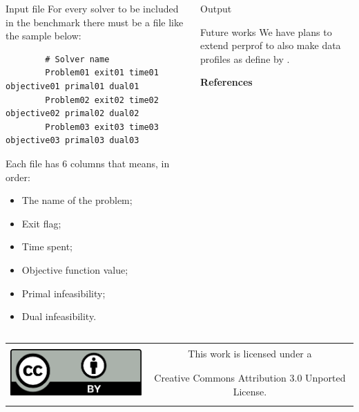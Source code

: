 \documentclass[]{beamer}
\begin{document}
\begin{frame}[t,fragile]
\begin{columns}[t]
\begin{column}{0.4\textwidth}
      \begin{block}{Input file}
        For every solver to be included in the benchmark there must be a file like
        the sample below:

        \begin{lstlisting}
        # Solver name
        Problem01 exit01 time01 objective01 primal01 dual01
        Problem02 exit02 time02 objective02 primal02 dual02
        Problem03 exit03 time03 objective03 primal03 dual03
        \end{lstlisting}

        Each file has 6 columns that means, in order:
        \begin{itemize}
          \item The name of the problem;
          \item Exit flag;
          \item Time spent;
          \item Objective function value;
          \item Primal infeasibility;
          \item Dual infeasibility.
        \end{itemize}
      \end{block}
    \end{column}
    \begin{column}{0.4\textwidth}
      \begin{block}{Output}
        
      \end{block}

      \begin{block}{Future works}
        We have plans to extend perprof to also make data profiles as define by
        \citeauthor{More2009}.
      \end{block}

      \textbf{References}

      \printbibliography
    \end{column}
  \end{columns}
  \vfill
  \begin{center}
    \begin{tabular}[]{cc}
      \multirow{2}{*}{\includegraphics[height=60pt]{figures/cc-by}} &
      \Large{This work is licensed under a}\\ &
      \Large{Creative Commons Attribution 3.0 Unported License.}
    \end{tabular}
  \end{center}
\end{frame}
\end{document}
